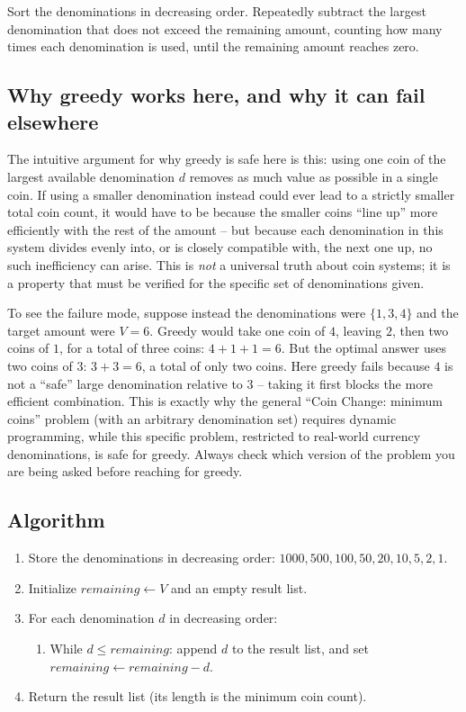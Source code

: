 \begin{ideabox}
Sort the denominations in decreasing order. Repeatedly subtract the largest
denomination that does not exceed the remaining amount, counting how many
times each denomination is used, until the remaining amount reaches zero.
\end{ideabox}

\subsection*{Why greedy works here, and why it can fail elsewhere}

The intuitive argument for why greedy is safe here is this: using one coin
of the largest available denomination $d$ removes as much value as possible
in a single coin. If using a smaller denomination instead could ever lead to
a strictly smaller total coin count, it would have to be because the smaller
coins ``line up'' more efficiently with the rest of the amount -- but because
each denomination in this system divides evenly into, or is closely
compatible with, the next one up, no such inefficiency can arise. This is
\emph{not} a universal truth about coin systems; it is a property that must
be verified for the specific set of denominations given.

To see the failure mode, suppose instead the denominations were
$\{1, 3, 4\}$ and the target amount were $V = 6$. Greedy would take one coin
of $4$, leaving $2$, then two coins of $1$, for a total of three coins:
$4+1+1=6$. But the optimal answer uses two coins of $3$: $3+3=6$, a total of
only two coins. Here greedy fails because $4$ is not a ``safe'' large
denomination relative to $3$ -- taking it first blocks the more efficient
combination. This is exactly why the general ``Coin Change: minimum coins''
problem (with an arbitrary denomination set) requires dynamic programming,
while this specific problem, restricted to real-world currency
denominations, is safe for greedy. Always check which version of the
problem you are being asked before reaching for greedy.

\subsection*{Algorithm}

\begin{enumerate}
  \item Store the denominations in decreasing order:
        $1000, 500, 100, 50, 20, 10, 5, 2, 1$.
  \item Initialize $\textit{remaining} \gets V$ and an empty result list.
  \item For each denomination $d$ in decreasing order:
  \begin{enumerate}
    \item While $d \le \textit{remaining}$: append $d$ to the result list,
          and set $\textit{remaining} \gets \textit{remaining} - d$.
  \end{enumerate}
  \item Return the result list (its length is the minimum coin count).
\end{enumerate}

